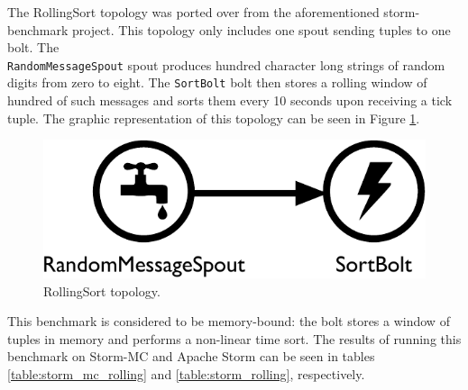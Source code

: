 The RollingSort topology was ported over from the aforementioned storm-benchmark project. This topology only includes one spout sending tuples to one bolt. The \\ \texttt{RandomMessageSpout} spout produces hundred character long strings of random digits from zero to eight. The \texttt{SortBolt} bolt then stores a rolling window of hundred of such messages and sorts them every 10 seconds upon receiving a tick tuple. The graphic representation of this topology can be seen in Figure \ref{fig:rolling_topology}.

\begin{figure}[!htb]
	\centering
	\includegraphics[scale=0.475]{pdf/rolling_topology.pdf}
	\caption{RollingSort topology.}
	\label{fig:rolling_topology}
\end{figure}

This benchmark is considered to be memory-bound: the bolt stores a window of tuples in memory and performs a non-linear time sort. The results of running this benchmark on Storm-MC and Apache Storm can be seen in tables \ref{table:storm_mc_rolling} and \ref{table:storm_rolling}, respectively.

